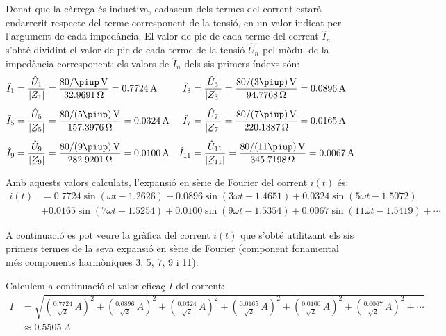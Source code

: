 \begin{exemple}
    Donat que la càrrega és inductiva, cadascun dels
    termes del corrent estarà endarrerit respecte del terme corresponent
    de la tensió, en un valor indicat per l'argument de cada impedància.
    El valor de pic de cada terme del corrent $\hat{I}_n$ s'obté
    dividint el valor de pic de cada terme de la tensió $\hat{U}_n$ pel
    mòdul de la impedància corresponent; els valors de $\hat{I}_n$ dels sis primers índexs són:
    \begin{align*}
        \hat{I}_1 &= \frac{\hat{U}_1}{|\cmplx{Z}_1|} = \frac{80/\piup\unit{\,V}}{\qty{32,9691}{\ohm}} = \qty{0,7724}{A}
        & \hat{I}_3 &= \frac{\hat{U}_3}{|\cmplx{Z}_3|} =\frac{80/(3\piup)\unit{\,V}}{\qty{94,7768}{\ohm}} = \qty{0,0896}{A}\\[1ex]
        \hat{I}_5 &= \frac{\hat{U}_5}{|\cmplx{Z}_5|} =\frac{80/(5\piup)\unit{\,V}}{\qty{157,3976}{\ohm}} =\qty{0,0324}{A}
        & \hat{I}_7 &= \frac{\hat{U}_7}{|\cmplx{Z}_7|} =\frac{80/(7\piup)\unit{\,V}}{\qty{220,1387}{\ohm}} =
        \qty{0,0165}{A}\\[1ex]
        \hat{I}_9 &= \frac{\hat{U}_9}{|\cmplx{Z}_9|} =\frac{80/(9\piup)\unit{\,V}}{\qty{282,9201}{\ohm}} =
        \qty{0,0100}{A} & \hat{I}_{11} &= \frac{\hat{U}_{11}}{|\cmplx{Z}_{11}|} =\frac{80/(11\piup)\unit{\,V}}
        {\qty{345,7198}{\ohm}} =  \qty{0,0067}{A}
    \end{align*}

    Amb aquests valors calculats, l'expansió en sèrie de Fourier del
    corrent $i(t)$ és:
    \[\begin{split}
         i(t) &=  \num{0,7724} \sin(\omega t - \num{1,2626}) +  \num{0,0896} \sin(3 \omega t -
         \num{1,4651}) + \num{0,0324} \sin(5 \omega t - \num{1,5072}) \\
         &+ \num{0,0165} \sin(7 \omega t - \num{1,5254}) + \num{0,0100} \sin(9 \omega t - \num{1,5354})
         + \num{0,0067} \sin(11 \omega t - \num{1,5419}) +\cdots
    \end{split}\]

    A continuació es pot veure la gràfica del corrent $i(t)$ que
    s'obté utilitzant els sis primers termes de la seva expansió en
    sèrie de Fourier (component fonamental més components harmòniques 3, 5, 7, 9 i 11):

    \begin{center}
      
    \end{center}

    Calculem a continuació el valor eficaç $I$ del corrent:
    \[\begin{split}
        I &= \sqrt{\left(\tfrac{\num{0,7724}}{\sqrt{2}}\unit{\,A}\right)^2 +
            \left(\tfrac{\num{0,0896}}{\sqrt{2}}\unit{\,A}\right)^2 +
            \left(\tfrac{\num{0,0324}}{\sqrt{2}}\unit{\,A}\right)^2 +
            \left(\tfrac{\num{0,0165}}{\sqrt{2}}\unit{\,A}\right)^2 +
            \left(\tfrac{\num{0,0100}}{\sqrt{2}}\unit{\,A}\right)^2 +
            \left(\tfrac{\num{0,0067}}{\sqrt{2}}\unit{\,A}\right)^2 + \cdots}
             \\[1ex]
            &\approx \qty{0,5505}{A}
    \end{split}\]


\end{exemple}
